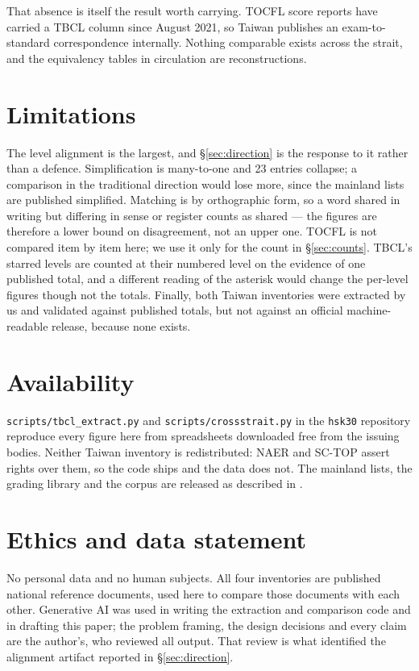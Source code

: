 \documentclass[11pt]{article}
\begin{document}
That absence is itself the result worth carrying. TOCFL score reports have
carried a TBCL column since August 2021, so Taiwan publishes an
exam-to-standard correspondence internally. Nothing comparable exists across
the strait, and the equivalency tables in circulation are reconstructions.

\section{Limitations}

The level alignment is the largest, and \S\ref{sec:direction} is the response to
it rather than a defence. Simplification is many-to-one and 23 entries collapse;
a comparison in the traditional direction would lose more, since the mainland
lists are published simplified. Matching is by orthographic form, so a word
shared in writing but differing in sense or register counts as shared --- the
figures are therefore a lower bound on disagreement, not an upper one. TOCFL is
not compared item by item here; we use it only for the count in
\S\ref{sec:counts}. TBCL's starred levels are counted at their numbered level on
the evidence of one published total, and a different reading of the asterisk
would change the per-level figures though not the totals. Finally, both Taiwan
inventories were extracted by us and validated against published totals, but not
against an official machine-readable release, because none exists.

\section*{Availability}

\texttt{scripts/tbcl\_extract.py} and \texttt{scripts/crossstrait.py} in the
\texttt{hsk30} repository reproduce every figure here from spreadsheets
downloaded free from the issuing bodies. Neither Taiwan inventory is
redistributed: NAER and SC-TOP assert rights over them, so the code ships and
the data does not. The mainland lists, the grading library and the corpus are
released as described in \citet{serrano2026whichhsk}.

\section*{Ethics and data statement}

No personal data and no human subjects. All four inventories are published
national reference documents, used here to compare those documents with each
other. Generative AI was used in writing the extraction and comparison code and
in drafting this paper; the problem framing, the design decisions and every
claim are the author's, who reviewed all output. That review is what identified
the alignment artifact reported in \S\ref{sec:direction}.


\end{document}
